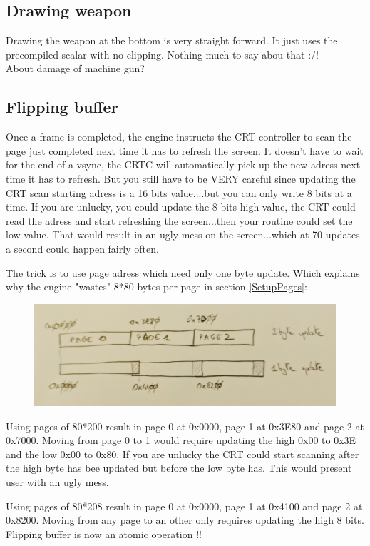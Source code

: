 \subsection{Drawing weapon}
Drawing the weapon at the bottom is very straight forward. It just uses the precompiled scalar with no clipping. Nothing much to say abou that :/!\\
 About damage of machine gun?





\subsection{Flipping buffer} \label{Flippingbuffer}
Once a frame is completed, the engine instructs the CRT controller to scan the page just completed next time it has to refresh the screen. It doesn't have to wait for the end of a vsync, the CRTC will automatically pick up the new adress next time it has to refresh. But you still have to be VERY careful since updating the CRT scan starting adress is a 16 bits value....but you can only write 8 bits at a time. If you are unlucky, you could update the 8 bits high value, the CRT could read the adress and start refreshing the screen...then your routine could set the low value. That would result in an ugly mess on the screen...which at 70 updates a second could happen fairly often.\\
\par
The trick is to use page adress which need only one byte update. Which explains why the engine "wastes" 8*80 bytes per page in section \ref{SetupPages}:\\
\par
\begin{figure}[H]
 \centering
 \includegraphics[width=\textwidth]{imgs/triple_pages_trick.png}
\end{figure}
\par
Using pages of 80*200 result in page 0 at 0x0000, page 1 at 0x3E80 and page 2 at 0x7000. Moving from page 0 to 1 would require updating the high 0x00 to 0x3E and the low 0x00 to 0x80. If you are unlucky the CRT could start scanning after the high byte has bee updated but before the low byte has. This would present user with an ugly mess.\\
\par
Using pages of 80*208 result in page 0 at 0x0000, page 1 at 0x4100 and page 2 at 0x8200. Moving from any page to an other only requires updating the high 8 bits. Flipping buffer is now an atomic operation !!\\





